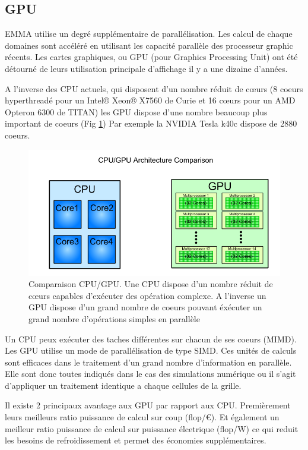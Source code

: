 

\subsection{GPU}

EMMA utilise un degré supplémentaire de parallélisation.
Les calcul de chaque domaines sont accéléré en utilisant les capacité parallèle des processeur graphic récents.
Les cartes graphiques, ou GPU (pour Graphics Processing Unit) ont été détourné de leurs utilisation principale d'affichage il y a une dizaine d'années.

A l'inverse des CPU actuels, qui disposent d'un nombre réduit de cœurs (8 coeurs hyperthreadé pour un Intel® Xeon® X7560 de Curie et 16 cœurs pour un AMD Opteron 6300 de TITAN) les GPU dispose d'une nombre beaucoup plus important de coeurs (Fig \ref{fig:cpugpu})
Par exemple la NVIDIA Tesla k40c dispose de 2880 coeurs.

\begin{figure}[bth]
        \includegraphics[width=.95\linewidth]{img/02/cpu_vs_gpu.png} 
        \caption{Comparaison CPU/GPU. Une CPU dispose d'un nombre réduit de cœurs capables d’exécuter des opération complexe. A l'inverse un GPU dispose d'un grand nombre de coeurs pouvant éxécuter un grand nombre d'opérations simples en parallèle}
 		\label{fig:cpugpu}
\end{figure}


Un CPU peux exécuter des taches différentes sur chacun de ses coeurs (MIMD).
Les GPU utilise un mode de parallélisation de type SIMD.
Ces unités de calculs sont  efficaces dans le traitement d'un grand nombre d'information en parallèle.
Elle sont donc toutes indiqués dans le cas des simulations numérique ou il s'agit d'appliquer un traitement identique a chaque cellules de la grille.

Il existe 2 principaux avantage aux GPU par rapport aux CPU.
Premièrement leurs meilleurs ratio puissance de calcul sur coup (flop/€).
Et également un meilleur ratio puissance de calcul sur puissance élcetrique (flop/W) ce qui reduit les besoins de refroidissement et permet des économies supplémentaires.


